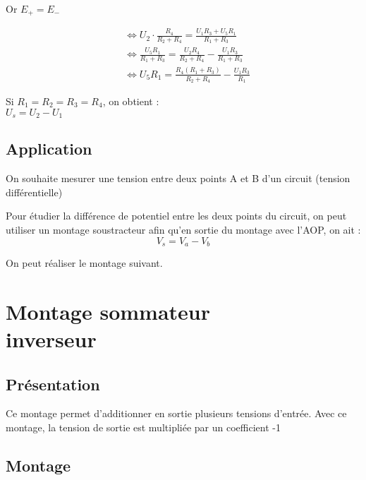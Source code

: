 Or $E_+=E_-$

\begin{align}
&\Leftrightarrow U_2 \cdot \frac{R_4}{R_2+R_4} = \frac{U_1R_3+U_5R_1}{R_1+R_3} \\
&\Leftrightarrow  \frac{U_5R_1}{R_1+R_3} = \frac{U_2R_4}{R_2+R_4} -\frac{U_1R_3}{R_1+R_3} \\
&\Leftrightarrow  U_5R_1 = \frac{R_4(R_1+R_3)}{R_2+R_4} - \frac{U_1R_3}{R_1} 
\end{align}


Si $R_1=R_2=R_3=R_4$, on obtient : \\

$U_s=U_2-U_1$\\

\section{Application}

\begin{exemple}
On souhaite mesurer une tension entre deux points A et B d’un circuit (tension différentielle)
\end{exemple}


Pour étudier la différence de potentiel entre les deux points du circuit, on peut utiliser un montage soustracteur afin qu’en sortie du montage avec l’AOP, on ait : $$V_s=V_a-V_b$$

On peut réaliser le montage suivant.



\chapter{Montage sommateur \\inverseur }

\section{Présentation}
Ce montage permet d'additionner en sortie plusieurs tensions d’entrée. Avec ce montage, la tension de sortie est multipliée par un coefficient -1

\section{Montage}

